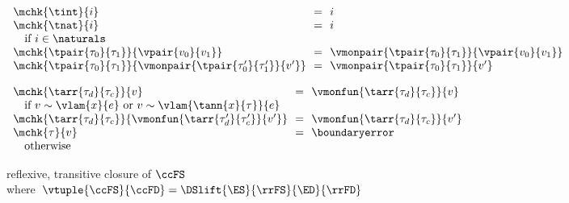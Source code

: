 \begin{flushleft}
\medskip
{}
\begin{minipage}[t]{\columnwidth}
$\begin{array}{l@{~~}c@{~~}l}
  \mchk{\tint}{i} & = & i
\\
  \mchk{\tnat}{i} & = & i
\\ \multicolumn{3}{l}{\mbox{\quad if $i \in \naturals$}}
\\
  \mchk{\tpair{\tau_0}{\tau_1}}{\vpair{v_0}{v_1}} & = & \vmonpair{\tpair{\tau_0}{\tau_1}}{\vpair{v_0}{v_1}}
\\
  \mchk{\tpair{\tau_0}{\tau_1}}{\vmonpair{\tpair{\tau_0'}{\tau_1'}}{v'}} & = & \vmonpair{\tpair{\tau_0}{\tau_1}}{v'}
\end{array}$
\end{minipage}%
\begin{minipage}[t]{\columnwidth}
$\begin{array}{l@{~~}c@{~~}l}
  \mchk{\tarr{\tau_d}{\tau_c}}{v} & = & \vmonfun{\tarr{\tau_d}{\tau_c}}{v}
\\ \multicolumn{3}{l}{\mbox{\quad if $v \sim \vlam{x}{e}$ or $v \sim \vlam{\tann{x}{\tau}}{e}$}}
\\
  \mchk{\tarr{\tau_d}{\tau_c}}{\vmonfun{\tarr{\tau_d'}{\tau_c'}}{v'}} & = & \vmonfun{\tarr{\tau_d}{\tau_c}}{v'}
\\
  \mchk{\tau}{v} & = & \boundaryerror
\\ \multicolumn{3}{l}{\mbox{\quad otherwise}}
\end{array}$
\end{minipage}

\medskip
{} reflexive, transitive closure of $\ccFS$\\
\mbox{\quad where $\vtuple{\ccFS}{\ccFD} = \DSlift{\ES}{\rrFS}{\ED}{\rrFD}$}
\smallskip
\end{flushleft}
